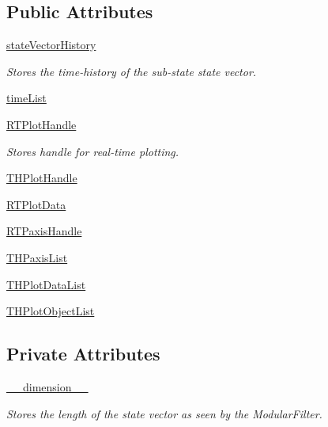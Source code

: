 \subsection*{Public Attributes}
\begin{DoxyCompactItemize}
\item 
\hyperlink{classmodest_1_1substates_1_1substate_1_1SubState_a38c12c9d0899bc1161f3502b584517a2}{state\+Vector\+History}
\begin{DoxyCompactList}\small\item\em Stores the time-\/history of the sub-\/state state vector. \end{DoxyCompactList}\item 
\hyperlink{classmodest_1_1substates_1_1substate_1_1SubState_a9b7a77e3b7dc14fc85962cda84e8cd58}{time\+List}
\item 
\hyperlink{classmodest_1_1substates_1_1substate_1_1SubState_a37ded775b84cea85b4dce0f1b16286c4}{R\+T\+Plot\+Handle}
\begin{DoxyCompactList}\small\item\em Stores handle for real-\/time plotting. \end{DoxyCompactList}\item 
\hyperlink{classmodest_1_1substates_1_1substate_1_1SubState_af1d5d3bbdf73cf1e78925c835f1c616e}{T\+H\+Plot\+Handle}
\item 
\hyperlink{classmodest_1_1substates_1_1substate_1_1SubState_a9fefae1facc797a1132fb61a55e9ffa1}{R\+T\+Plot\+Data}
\item 
\hyperlink{classmodest_1_1substates_1_1substate_1_1SubState_a497ccbb6658589b02568e87c6382222e}{R\+T\+Paxis\+Handle}
\item 
\hyperlink{classmodest_1_1substates_1_1substate_1_1SubState_a22c12497c37f47d54d4ea909f6423222}{T\+H\+Paxis\+List}
\item 
\hyperlink{classmodest_1_1substates_1_1substate_1_1SubState_a0e1d545f7ede186d89db38ca613633cf}{T\+H\+Plot\+Data\+List}
\item 
\hyperlink{classmodest_1_1substates_1_1substate_1_1SubState_a9659535520a27090d79be1957ecce2eb}{T\+H\+Plot\+Object\+List}
\end{DoxyCompactItemize}
\subsection*{Private Attributes}
\begin{DoxyCompactItemize}
\item 
\hyperlink{classmodest_1_1substates_1_1substate_1_1SubState_a5b1c0756a69da7f293a415c7d2d77843}{\+\_\+\+\_\+dimension\+\_\+\+\_\+}
\begin{DoxyCompactList}\small\item\em Stores the length of the state vector as seen by the Modular\+Filter. \end{DoxyCompactList}\end{DoxyCompactItemize}
